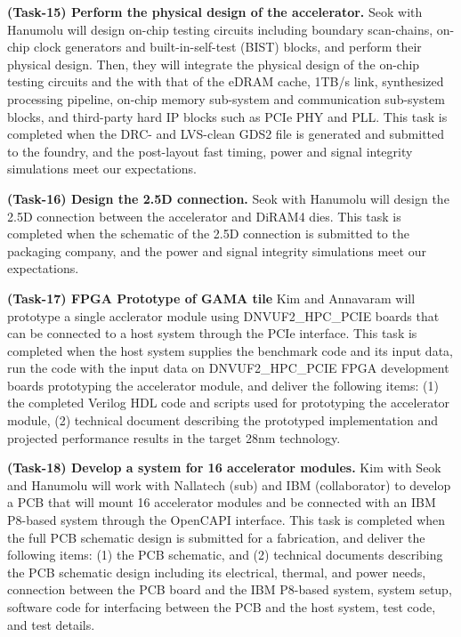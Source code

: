 \vspace{3pt}
\noindent
\textbf{(Task-15) Perform the physical design of the accelerator.} 
Seok with Hanumolu will design on-chip testing circuits including boundary scan-chains, on-chip clock generators and built-in-self-test (BIST) blocks, and perform their physical design.
Then, they will integrate the physical design of the on-chip testing circuits and the with that of the eDRAM cache, 1TB/s link, synthesized processing pipeline, on-chip memory sub-system and communication sub-system blocks, and third-party hard IP blocks such as PCIe PHY and PLL.
This task is completed when the DRC- and LVS-clean GDS2 file is generated and submitted to the foundry, and the post-layout fast timing, power and signal integrity simulations meet our expectations.


\vspace{3pt}
\noindent
\textbf{(Task-16) Design the 2.5D connection.} 
Seok with Hanumolu will design the 2.5D connection between the accelerator and DiRAM4 dies.
This task is completed when the schematic of the 2.5D connection is submitted to the packaging company, and the power and signal integrity simulations meet our expectations.


\vspace{3pt}
\noindent
\textbf{(Task-17) FPGA Prototype of GAMA tile}
Kim and Annavaram will prototype a single acclerator module using DNVUF2\_HPC\_PCIE boards that can be connected to a host system through the PCIe interface.
This task is completed when the host system supplies the benchmark code and its input data, run the code with the input data on DNVUF2\_HPC\_PCIE FPGA development boards prototyping the accelerator module, and deliver the following items:
(1) the completed Verilog HDL code and scripts used for prototyping the accelerator module,  
(2) technical document describing the prototyped implementation and projected performance results in the target 28nm technology.


\vspace{3pt}
\noindent
\textbf{(Task-18) Develop a system for 16 accelerator modules.}
Kim with Seok and Hanumolu will work with Nallatech (sub) and IBM (collaborator) to develop a PCB that will mount 16 accelerator modules and be connected with an IBM P8-based system through the OpenCAPI interface.
This task is completed when the full PCB schematic design is submitted for a fabrication, and deliver the following items:
(1) the PCB schematic, and
(2) technical documents describing the PCB schematic design including its electrical, thermal, and power needs, connection between the PCB board and the IBM P8-based system, 
system setup, software code for interfacing between the PCB and the host system, test code, and test details. 

